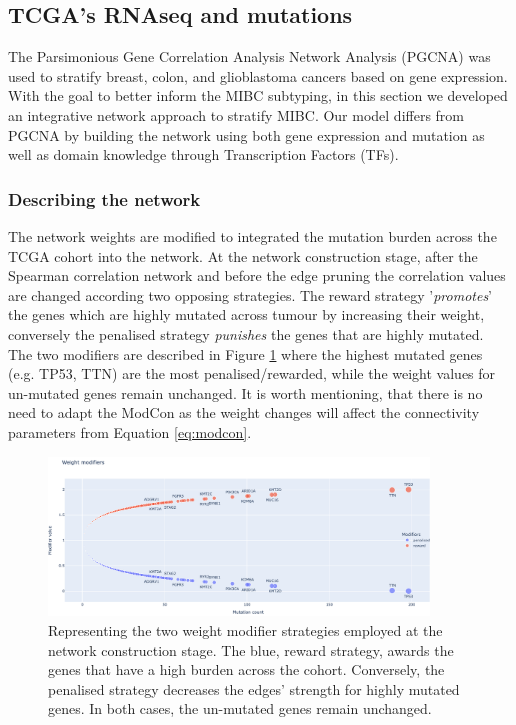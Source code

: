 \subsection{TCGA's RNAseq and mutations} \label{s:N_I:weights}


The Parsimonious Gene Correlation Analysis Network Analysis (PGCNA) was used to stratify breast, colon, and glioblastoma cancers \cite{Care2019-ij,Tanner2023-wa} based on gene expression. With the goal to better inform the MIBC subtyping, in this section we developed an integrative network approach to stratify MIBC. Our model differs from PGCNA by building the network using both gene expression and mutation as well as  domain knowledge through Transcription Factors (TFs).

\subsubsection{Describing the network}

The network weights are modified to integrated the mutation burden across the TCGA cohort into the network. At the network construction stage, after the Spearman correlation network and before the edge pruning the correlation values are changed according two opposing strategies. The reward strategy '\textit{promotes}' the genes which are highly mutated across tumour by increasing their weight, conversely the penalised strategy \textit{punishes} the genes that are highly mutated. The two modifiers are described in Figure \ref{fig:N_I:modifiers} where the highest mutated genes (e.g. TP53, TTN) are the most penalised/rewarded, while the weight values for un-mutated genes remain unchanged. It is worth mentioning, that there is no need to adapt the ModCon as the weight changes will affect the connectivity parameters from Equation \ref{eq:modcon}.

\begin{figure}[!htb]    \centering\includegraphics[width=0.9\textwidth,height=0.9\textheight,keepaspectratio]{Sections/Network_I/Resources/Methods/modifiers.png}
    \caption{Representing the two weight modifier strategies employed at the network construction stage. The blue, reward strategy, awards the genes that have a high burden across the cohort. Conversely, the  penalised strategy decreases the edges' strength for highly mutated genes. In both cases, the un-mutated genes remain unchanged.}
    \label{fig:N_I:modifiers}
\end{figure}


